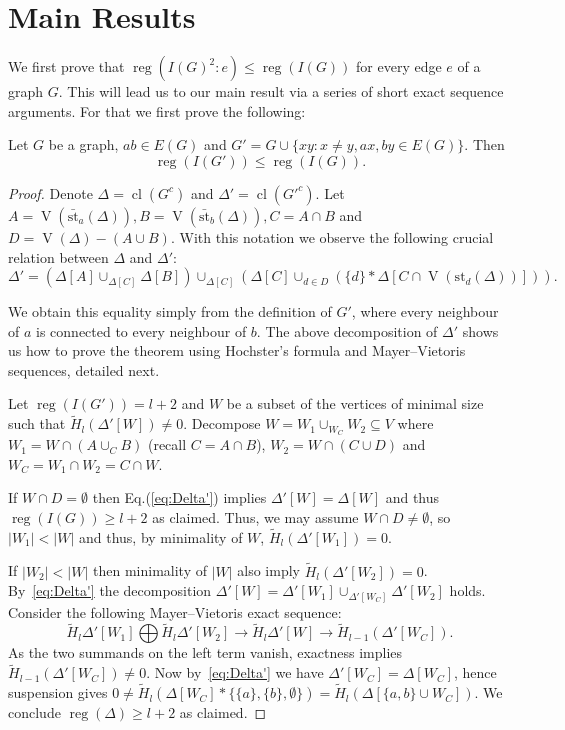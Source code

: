 \documentclass[ALCO,published]{cedram}
\numberwithin{equation}{section}
\newcommand \reg{\operatorname{reg}}
\newcommand \Vr{\operatorname{V}}
\newcommand \cl{\operatorname{cl}}
\newcommand \St{\text{st}}
\begin{document}
\section{Main Results}\label{sec:main_results}
 We first prove that $\reg(I(G)^2:e) \leq \reg(I(G))$ for every edge $e$ of a graph $G$. This will lead us to our main result via a series of short exact sequence arguments. For that we first prove the following:

\begin{theorem}\label{thm:reg(D')}
Let $G$ be a graph, $ab \in E(G)$ and $G'=G \cup \{xy: x\neq y,  ax,by \in E(G)\}$. Then
 $$\reg (I(G') ) \leq \reg(I(G)).$$
\end{theorem}

\begin{proof}
Denote $\Delta=\cl(G^c)$ and $\Delta'=\cl(G'^c)$.
Let $A=\Vr(\bar{\St}_a (\Delta)),B=\Vr(\bar{\St}_b(\Delta)), C=A\cap B$ and $D=\Vr(\Delta)-(A\cup B)$. With this notation we observe the following crucial relation between $\Delta$ and $\Delta'$:
\begin{equation}\label{eq:Delta'}
 \Delta'=(\Delta[A]\cup_{\Delta[C]} \Delta[B])\cup_{\Delta[C]} (\Delta[C] \cup_{d\in D} (\{d\}*\Delta[C \cap \Vr(\St_d (\Delta))])).
\end{equation}

 We obtain this equality simply from the definition of $G'$, where every neighbour of $a$ is connected to every neighbour of $b$.
 The above decomposition of $\Delta'$ shows us how to prove the theorem using Hochster's formula and Mayer--Vietoris sequences, detailed next.


 Let $\reg(I(G')) = l+2$ and $W$ be a subset of the vertices of minimal size such that $\widetilde{H}_l (\Delta'[W]) \neq 0$.
 Decompose $W=W_1 \cup_{W_C} W_2 \subseteq V$ where $W_1=W\cap(A\cup_C B)$ (recall $C=A\cap B$), $W_2=W\cap(C\cup D)$ and $W_C=W_1\cap W_2=C \cap W$.

If $W\cap D=\emptyset$ then Eq.(\ref{eq:Delta'}) implies $\Delta'[W]=\Delta[W]$ and thus $\reg(I(G))\ge l+2$ as claimed.
Thus, we may assume
$W\cap D\neq \emptyset$, so $|W_1|<|W|$ and thus, by minimality of $W$, $\widetilde{H}_l(\Delta'[W_1])=0$.

If $|W_2|<|W|$ then minimality of $|W|$ also imply $\widetilde{H}_l(\Delta'[W_2])=0$.
By~\eqref{eq:Delta'} the decomposition $\Delta'[W]=\Delta'[W_1] \cup_{\Delta'[W_C]} \Delta'[W_2]$ holds. Consider the following Mayer--Vietoris exact sequence: $$\widetilde{H}_l \Delta'[W_1] \bigoplus \widetilde{H}_l \Delta'[W_2] \longrightarrow \widetilde{H}_l \Delta'[W] \longrightarrow \widetilde{H}_{l-1} (\Delta'[W_C]).$$
As the two summands on the left term vanish, exactness implies
$\widetilde{H}_{l-1} (\Delta'[W_C])\neq 0$. 
Now by~\eqref{eq:Delta'} we have  $\Delta'[W_C]=\Delta[W_C]$, hence suspension gives
  $0 \neq \widetilde{H}_l(\Delta[W_C] * \{\{a\},\{b\},\emptyset\})= \widetilde{H}_l(\Delta[\{a,b\} \cup W_C])$.
 We conclude $\reg (\Delta) \geq l+2$ as claimed.


\end{proof}
\end{document}

